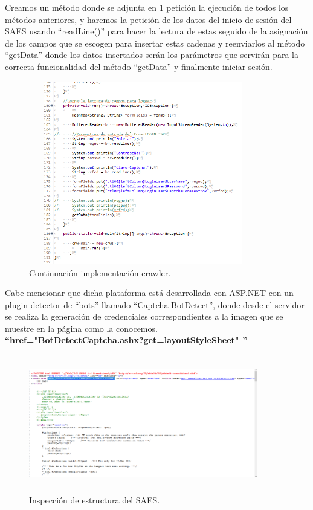 	\noindent Creamos un método donde se adjunta en 1 petición la ejecución de todos los métodos anteriores, y haremos la petición de los datos del inicio de sesión del SAES usando “readLine()” para hacer la lectura de estas seguido de la asignación de los campos que se escogen para insertar estas cadenas y reenviarlos al método “getData” donde los datos insertados serán los parámetros que servirán para la correcta funcionalidad del método “getData” y finalmente iniciar sesión.\\
	\begin{figure} [hbt!]
		\centering
		\includegraphics[width=10cm, height=8cm]{Imagenes/Crawler/Codigo6}
		\caption{Continuación implementación crawler.}
		\label{codigo6}
	\end{figure}
	\pagebreak
	\noindent Cabe mencionar que dicha plataforma está desarrollada con ASP.NET con un plugin detector de “bots” llamado “Captcha BotDetect”, donde desde el servidor se realiza la generación de credenciales correspondientes a la imagen que se muestre en la página como la conocemos.\\
	\textbf{“href="BotDetectCaptcha.ashx?get=layoutStyleSheet" ”}\\
	\begin{figure} [hbt!]
		\centering
		\includegraphics[width=10cm, height=6cm]{Imagenes/Crawler/ASP2}
		\caption{Inspección de estructura del SAES.}
		\label{asp2}
	\end{figure}
	
